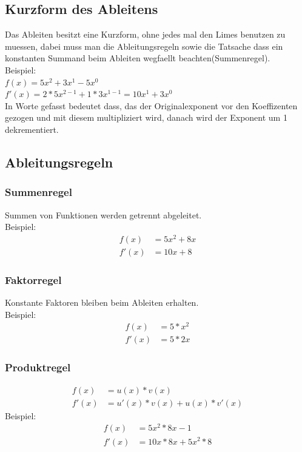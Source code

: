 \documentclass[a4paper]{article} %
\begin{document}
	\subsection{Kurzform des Ableitens}
	
	Das Ableiten besitzt eine Kurzform, ohne jedes mal den Limes benutzen zu muessen, dabei muss man die Ableitungsregeln sowie die Tatsache dass ein konstanten Summand beim Ableiten wegfaellt beachten(Summenregel).
\\	Beispiel:\\
	$f(x)  =5x^2+3x^1-5x^0$\\
	$f'(x)  =2*5x^{2-1}+1*3x^{1-1} = 10x^1+3x^0$\\
	In Worte gefasst bedeutet dass, das der Originalexponent vor den Koeffizenten gezogen und mit diesem multipliziert wird, danach wird der Exponent um 1 dekrementiert.
	\subsection{Ableitungsregeln}
	\subsubsection{Summenregel}
	Summen von Funktionen werden getrennt abgeleitet. \\
	Beispiel: \\ 
		\begin{align*}
			f(x) &= 5x^2+8x  \\
			 f'(x)&= 10x+8
		\end{align*}
	\subsubsection{Faktorregel}
	Konstante Faktoren bleiben beim Ableiten erhalten. \\
	Beispiel: \\ \begin{align*}
					f(x)&= 5*x^2 \\ 
					f'(x) &= 5*2x
				\end{align*}
	
	\subsubsection{Produktregel}
	\begin{align*}
		f(x)&=u(x)*v(x)\\
		f'(x)&=u'(x)*v(x)+u(x)*v'(x)
	\end{align*}
	Beispiel: \\ 
	\begin{align*}
		f(x) &= 5x^2*8x-1  \\
		f'(x)&= 10x*8x+5x^2*8
	\end{align*}
\end{document}
